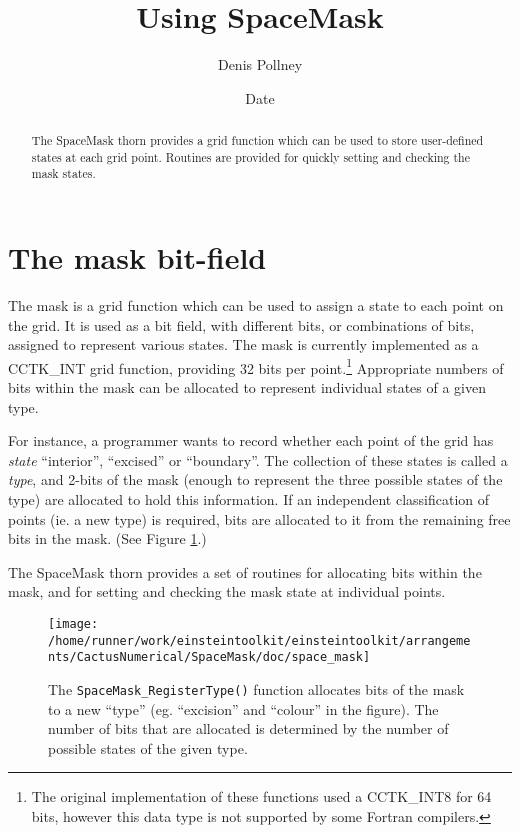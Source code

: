 \documentclass{article}
\begin{document}
\title{Using SpaceMask}
\author{Denis Pollney}
\date{$ $Date$ $}

\maketitle


\begin{abstract}
The SpaceMask thorn provides a grid function which can be used to
store user-defined states at each grid point. Routines are provided
for quickly setting and checking the mask states.
\end{abstract}

\section{The mask bit-field}

The mask is a grid function which can be used to assign a state to
each point on the grid. It is used as a bit field, with different
bits, or combinations of bits, assigned to represent various states.
The mask is currently implemented as a CCTK\_INT grid function,
providing 32 bits per point.\footnote{The original implementation of
these functions used a CCTK\_INT8 for 64 bits, however this data type
is not supported by some Fortran compilers.} Appropriate numbers of
bits within the mask can be allocated to represent individual states
of a given type.

For instance, a programmer wants to record whether each point of the
grid has \emph{state} ``interior'', ``excised'' or ``boundary''. The
collection of these states is called a \emph{type}, and 2-bits of the
mask (enough to represent the three possible states of the type) are
allocated to hold this information. If an independent classification
of points (ie. a new type) is required, bits are allocated to it from
the remaining free bits in the mask. (See Figure \ref{fig:mask_bits}.)

The SpaceMask thorn provides a set of routines for allocating bits
within the mask, and for setting and checking the mask state at
individual points.

\begin{figure}
  \centering
  \texttt{[image: /home/runner/work/einsteintoolkit/einsteintoolkit/arrangements/CactusNumerical/SpaceMask/doc/space\_mask]}
  \caption{The \texttt{SpaceMask\_RegisterType()} function allocates
  bits of the mask to a new ``type'' (eg. ``excision'' and ``colour''
  in the figure). The number of bits that are allocated is determined
  by the number of possible states of the given type.}
  \label{fig:mask_bits}
\end{figure}
\end{document}

